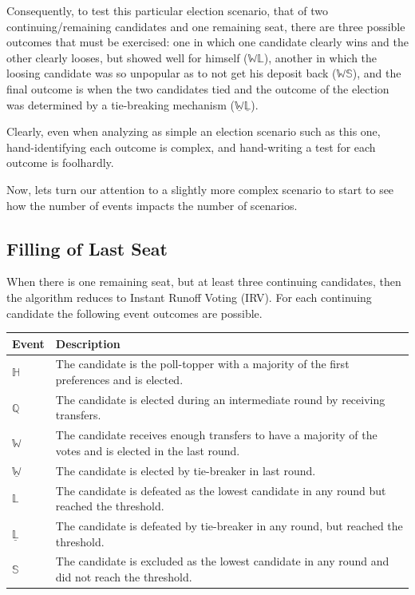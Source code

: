 \documentclass[runningheads,a4paper]{llncs}
\newcommand{\ballottwo}[2]{\ensuremath{\boxed{#1}\boxed{#2}}}
\newcommand{\winner}{\ensuremath{\mathbb{W}}}
\newcommand{\loser}{\ensuremath{\mathbb{L}}}
\newcommand{\quota}{\ensuremath{\mathbb{Q}}}
\newcommand{\belowthreshold}{\ensuremath{\mathbb{S}}}
\newcommand{\highwinner}{\ensuremath{\mathbb{H}}}
\newcommand{\tiebreak}[1]{\ensuremath{\underline{#1}}}
\begin{document}
Consequently, to test this particular election scenario, that of two
continuing/remaining candidates and one remaining seat, there are
three possible outcomes that must be exercised: one in which one
candidate clearly wins and the other clearly looses, but showed well
for himself ($\ballottwo{\winner}{\loser}$), another in which the
loosing candidate was so unpopular as to not get his deposit back
($\ballottwo{\winner}{\belowthreshold}$), and the final outcome is
when the two candidates tied and the outcome of the election was
determined by a tie-breaking mechanism
($\ballottwo{\tiebreak{\winner}}{\tiebreak{\loser}}$).

Clearly, even when analyzing as simple an election scenario such as
this one, hand-identifying each outcome is complex, and hand-writing a
test for each outcome is foolhardly.

Now, lets turn our attention to a slightly more complex scenario to
start to see how the number of events impacts the number of scenarios.

\subsection{Filling of Last Seat}

When there is one remaining seat, but at least three continuing
candidates, then the algorithm reduces to Instant Runoff Voting (IRV).
For each continuing candidate the following event outcomes are
possible.
\begin{center}
  \begin{longtable}{l|p{}}
    Event & Description \\ 
    \hline
    \highwinner & The candidate is the poll-topper with a majority of the
    first preferences and is elected. \\
    \quota & The candidate is elected during an intermediate round by
    receiving transfers. \\
    \winner & The candidate receives enough transfers to have a
    majority of the votes and is elected in the last round. \\
    \tiebreak{\winner} & The candidate is elected by tie-breaker in
    last round. \\
    \loser & The candidate is defeated as the lowest candidate in any round
    but reached the threshold. \\
    \tiebreak{\loser} & The candidate is defeated by tie-breaker in any
    round, but reached the threshold. \\
    \belowthreshold & The candidate is excluded as the lowest candidate in
    any round and did not reach the threshold. \\
  \end{longtable}
\end{center}
\end{document}
